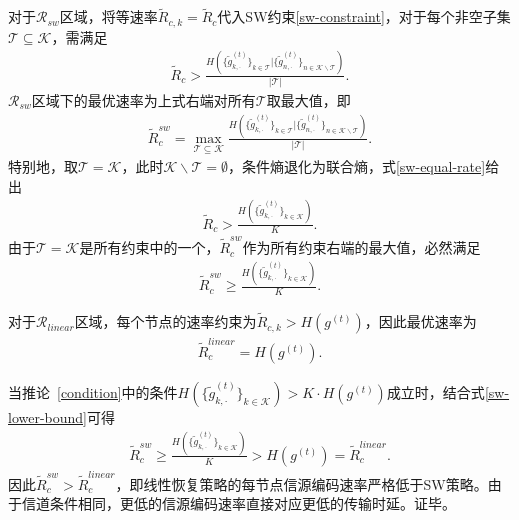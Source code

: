 对于$\mathcal{R}_{sw}$区域，将等速率$\tilde{R}_{c,k}=\tilde{R}_c$代入SW约束\eqref{sw-constraint}，对于每个非空子集$\mathcal{T}\subseteq\mathcal{K}$，需满足
\begin{align}
	\tilde{R}_c> \frac{H(\{\tilde{g}_{k,\cdot}^{(t)}\}_{k\in\mathcal{T}}|\{\tilde{g}_{n,\cdot}^{(t)}\}_{n\in\mathcal{K}\backslash\mathcal{T}})}{|\mathcal{T}|}.\label{sw-equal-rate}
\end{align}
$\mathcal{R}_{sw}$区域下的最优速率为上式右端对所有$\mathcal{T}$取最大值，即
\begin{align}
	\tilde{R}_c^{sw}=\max_{\mathcal{T}\subseteq\mathcal{K}}\frac{H(\{\tilde{g}_{k,\cdot}^{(t)}\}_{k\in\mathcal{T}}|\{\tilde{g}_{n,\cdot}^{(t)}\}_{n\in\mathcal{K}\backslash\mathcal{T}})}{|\mathcal{T}|}.
\end{align}
特别地，取$\mathcal{T}=\mathcal{K}$，此时$\mathcal{K}\backslash\mathcal{T}=\emptyset$，条件熵退化为联合熵，式\eqref{sw-equal-rate}给出
\begin{align}
	\tilde{R}_c>\frac{H(\{\tilde{g}_{k,\cdot}^{(t)}\}_{k\in\mathcal{K}})}{K}.
\end{align}
由于$\mathcal{T}=\mathcal{K}$是所有约束中的一个，$\tilde{R}_c^{sw}$作为所有约束右端的最大值，必然满足
\begin{align}
	\tilde{R}_c^{sw}\geq\frac{H(\{\tilde{g}_{k,\cdot}^{(t)}\}_{k\in\mathcal{K}})}{K}.\label{sw-lower-bound}
\end{align}

对于$\mathcal{R}_{linear}$区域，每个节点的速率约束为$\tilde{R}_{c,k}>H(g^{(t)})$，因此最优速率为
\begin{align}
	\tilde{R}_c^{linear}=H(g^{(t)}).
\end{align}

当推论~\ref{condition}中的条件$H(\{\tilde{g}_{k,\cdot}^{(t)}\}_{k\in\mathcal{K}})>K\cdot H(g^{(t)})$成立时，结合式\eqref{sw-lower-bound}可得
\begin{align}
	\tilde{R}_c^{sw}\geq\frac{H(\{\tilde{g}_{k,\cdot}^{(t)}\}_{k\in\mathcal{K}})}{K}>H(g^{(t)})=\tilde{R}_c^{linear}.
\end{align}
因此$\tilde{R}_c^{sw}>\tilde{R}_c^{linear}$，即线性恢复策略的每节点信源编码速率严格低于SW策略。由于信道条件相同，更低的信源编码速率直接对应更低的传输时延。证毕。

